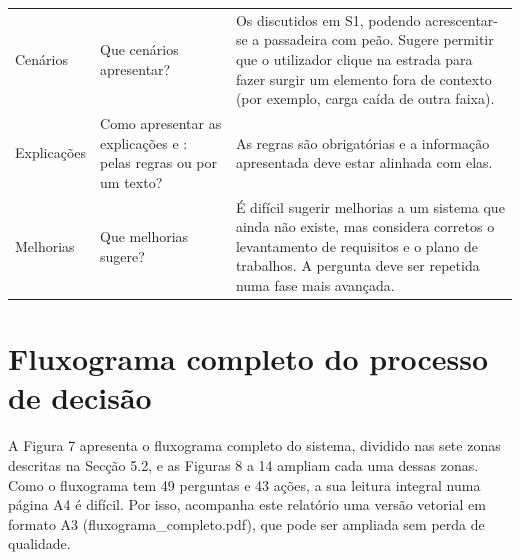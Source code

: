 \begin{longtable}{@{}L{0.17\textwidth}L{0.33\textwidth}L{0.44\textwidth}@{}}
Cenários & Que cenários apresentar? & Os discutidos em S1, podendo acrescentar-se a passadeira com peão. Sugere permitir que o utilizador clique na estrada para fazer surgir um elemento fora de contexto (por exemplo, carga caída de outra faixa). \\
Explicações & Como apresentar as explicações  e : pelas regras ou por um texto? & As regras são obrigatórias e a informação apresentada deve estar alinhada com elas. \\
Melhorias & Que melhorias sugere? & É difícil sugerir melhorias a um sistema que ainda não existe, mas considera corretos o levantamento de requisitos e o plano de trabalhos. A pergunta deve ser repetida numa fase mais avançada. \\
\end{longtable}
\endgroup

\chapter{Fluxograma completo do processo de decisão}\label{anx:fluxograma}

A Figura 7 apresenta o fluxograma completo do sistema, dividido nas sete zonas descritas na Secção 5.2, e as Figuras 8 a 14 ampliam cada uma dessas zonas. Como o fluxograma tem 49 perguntas e 43 ações, a sua leitura integral numa página A4 é difícil. Por isso, acompanha este relatório uma versão vetorial em formato A3 (fluxograma\_completo.pdf), que pode ser ampliada sem perda de qualidade.
